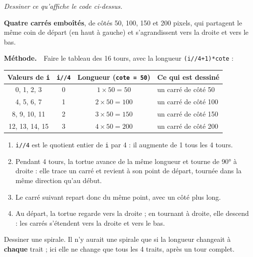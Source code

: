 \documentclass[addpoints, 11pt]{exam}
\newcommand{\enonce}[1]{\textit{#1}\par\smallskip}
\newcommand{\methode}{\par\smallskip\noindent\textbf{Méthode.}\ }
\newcommand{\code}[1]{\texttt{#1}}
\DeclareRobustCommand{\_}{\textunderscore\allowbreak}
\begin{document}
\begin{questions}
\question[2] \enonce{Dessiner ce qu'affiche le code ci-dessus.}
\begin{reponse}
\textbf{Quatre carrés emboîtés}, de côtés 50, 100, 150 et 200 pixels, qui partagent le même coin de départ (en haut à gauche) et s'agrandissent vers la droite et vers le bas.
\begin{center}
\end{center}
\end{reponse}
\methode\ Faire le tableau des 16 tours, avec la longueur \code{(i//4+1)*cote} :
\begin{center}
\begin{tabular}{|c|c|c|l|}
\hline
Valeurs de \code{i} & \code{i//4} & Longueur (\code{cote = 50}) & Ce qui est dessiné \\ \hline
0, 1, 2, 3 & 0 & $1 \times 50 = 50$ & un carré de côté 50 \\
4, 5, 6, 7 & 1 & $2 \times 50 = 100$ & un carré de côté 100 \\
8, 9, 10, 11 & 2 & $3 \times 50 = 150$ & un carré de côté 150 \\
12, 13, 14, 15 & 3 & $4 \times 50 = 200$ & un carré de côté 200 \\ \hline
\end{tabular}
\end{center}
\begin{enumerate}
  \item \code{i//4} est le quotient entier de \code{i} par 4 : il augmente de 1 tous les 4 tours.
  \item Pendant 4 tours, la tortue avance de la même longueur et tourne de 90° à droite : elle trace un carré et revient à son point de départ, tournée dans la même direction qu'au début.
  \item Le carré suivant repart donc du même point, avec un côté plus long.
  \item Au départ, la tortue regarde vers la droite ; en tournant à droite, elle descend : les carrés s'étendent vers la droite et vers le bas.
\end{enumerate}
\begin{erreur}
Dessiner une spirale. Il n'y aurait une spirale que si la longueur changeait à \textbf{chaque} trait ; ici elle ne change que tous les 4 traits, après un tour complet.
\end{erreur}


\end{questions}
\end{document}
